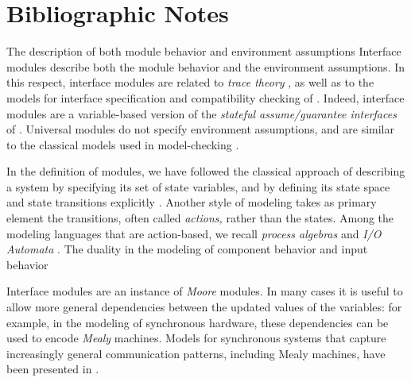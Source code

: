 \documentclass[11pt]{report}
\begin{document}
\section{Bibliographic Notes}

The description of both module behavior and environment assumptions
Interface modules describe both the module behavior and the
environment assumptions.
In this respect, interface modules are related to {\em trace theory\/}
\cite{DillThesis}, as well as to the models for interface
specification and compatibility checking of
\cite{luca-ia-01,luca-it-01}.
Indeed, interface modules are a variable-based version of
the {\em stateful assume/guarantee interfaces\/} of
\cite{luca-it-01}.
Universal modules do not specify environment assumptions, and are
similar to the classical models used in model-checking
\cite{SMV96,VIS96,RM96journal}.

In the definition of modules, we have followed the classical
approach of describing a system by specifying its set of state
variables, and by defining its state space and state transitions
explicitly \cite{Unity}.
Another style of modeling takes as primary element the transitions,
often called {\em actions,} rather than the states.
Among the modeling languages that are action-based, we recall
{\em process algebras\/} \cite{MilnerCCS,Hoare85,Hennessy88,Milner90}
and {\em I/O Automata\/} \cite{LT87,Lynch96}.
The duality in the modeling of component behavior and input behavior

Interface modules are an instance of {\em Moore\/} modules.
In many cases it is useful to allow more general dependencies between
the updated values of the variables: for example, in the modeling of
synchronous hardware, these dependencies can be used to encode
{\em Mealy\/} machines.
Models for synchronous systems that capture increasingly general
communication patterns, including Mealy machines, have been presented
in \cite{RM96journal,synchronous_control_00,synchronous_control_01}.



\end{document}
